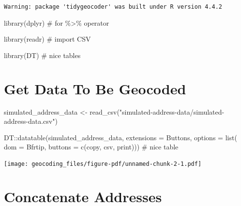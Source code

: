 \documentclass[
  letterpaper,
  DIV=11,
  numbers=noendperiod,
  oneside]{scrreprt}
\newenvironment{Shaded}{\begin{snugshade}}{\end{snugshade}}
\newcommand{\AttributeTok}[1]{\textcolor[rgb]{0.40,0.45,0.13}{#1}}
\newcommand{\CommentTok}[1]{\textcolor[rgb]{0.37,0.37,0.37}{#1}}
\newcommand{\FunctionTok}[1]{\textcolor[rgb]{0.28,0.35,0.67}{#1}}
\newcommand{\NormalTok}[1]{\textcolor[rgb]{0.00,0.23,0.31}{#1}}
\newcommand{\OtherTok}[1]{\textcolor[rgb]{0.00,0.23,0.31}{#1}}
\newcommand{\SpecialCharTok}[1]{\textcolor[rgb]{0.37,0.37,0.37}{#1}}
\newcommand{\StringTok}[1]{\textcolor[rgb]{0.13,0.47,0.30}{#1}}
\begin{document}
\begin{verbatim}
Warning: package 'tidygeocoder' was built under R version 4.4.2
\end{verbatim}

\begin{Shaded}
\begin{Highlighting}[]
\FunctionTok{library}\NormalTok{(dplyr) }\CommentTok{\# for \%\textgreater{}\% operator}

\FunctionTok{library}\NormalTok{(readr) }\CommentTok{\# import CSV}

\FunctionTok{library}\NormalTok{(DT) }\CommentTok{\# nice tables}
\end{Highlighting}
\end{Shaded}

\section{Get Data To Be Geocoded}\label{get-data-to-be-geocoded}

\begin{Shaded}
\begin{Highlighting}[]
\NormalTok{simulated\_address\_data }\OtherTok{\textless{}{-}} \FunctionTok{read\_csv}\NormalTok{(}\StringTok{"simulated{-}address{-}data/simulated{-}address{-}data.csv"}\NormalTok{)}

\NormalTok{DT}\SpecialCharTok{::}\FunctionTok{datatable}\NormalTok{(simulated\_address\_data,}
              \AttributeTok{extensions =} \StringTok{\textquotesingle{}Buttons\textquotesingle{}}\NormalTok{, }
              \AttributeTok{options =} \FunctionTok{list}\NormalTok{(}
                \AttributeTok{dom =} \StringTok{\textquotesingle{}Bfrtip\textquotesingle{}}\NormalTok{,}
                \AttributeTok{buttons =} \FunctionTok{c}\NormalTok{(}\StringTok{\textquotesingle{}copy\textquotesingle{}}\NormalTok{, }
                            \StringTok{\textquotesingle{}csv\textquotesingle{}}\NormalTok{, }
                            \StringTok{\textquotesingle{}print\textquotesingle{}}\NormalTok{))) }\CommentTok{\# nice table}
\end{Highlighting}
\end{Shaded}

\texttt{[image: geocoding\_files/figure-pdf/unnamed-chunk-2-1.pdf]}

\section{Concatenate Addresses}\label{concatenate-addresses}
\end{document}

